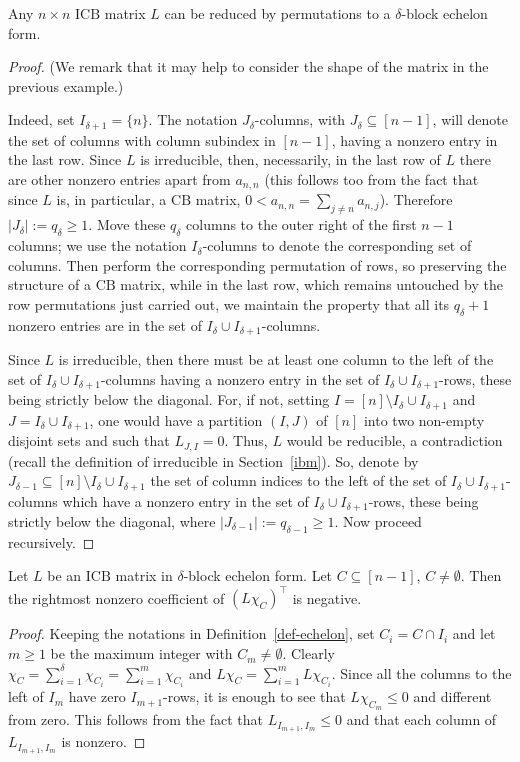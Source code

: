 \documentclass[ALCO]{cedram}
\newcommand{\icb}{\mbox{$\mathrm{ICB}$}}
\newcommand{\cb}{\mbox{$\mathrm{CB}$}}
\begin{document}
\begin{remark}\label{echelon-reduction}
Any $n\times n$ $\icb$ matrix $L$ can be reduced by permutations to a
$\delta$-block echelon form.
\end{remark}
\begin{proof} (We remark that it may help to consider 
the shape of the matrix in the previous example.)

Indeed, set $I_{\delta+1}=\{n\}$. The notation $J_\delta$-columns,
with $J_{\delta}\subseteq [n-1]$, will denote the set of columns with
column subindex in $[n-1]$, having a nonzero entry in the last
row. Since $L$ is irreducible, then, necessarily, in the last row of
$L$ there are other nonzero entries apart from $a_{n,n}$ (this follows
too from the fact that since $L$ is, in particular, a $\cb$ matrix,
$0<a_{n,n}=\sum_{j\neq n}a_{n,j}$). Therefore $\lvert
J_\delta\rvert:=q_\delta\geq 1$. Move these $q_\delta$ columns to the
outer right of the first $n-1$ columns; we use the notation
$I_\delta$-columns to denote the corresponding set of columns. Then
perform the corresponding permutation of rows, so preserving the
structure of a $\cb$ matrix, while in the last row, which remains
untouched by the row permutations just carried out, we maintain the
property that all its $q_\delta+1$ nonzero entries are in the set of
$I_\delta\cup I_{\delta+1}$-columns.

Since $L$ is irreducible, then there must be at least one column to
the left of the set of $I_\delta\cup I_{\delta+1}$-columns having a
nonzero entry in the set of $I_\delta\cup I_{\delta+1}$-rows, these
being strictly below the diagonal. For, if not, setting
$I=[n]\setminus I_\delta\cup I_{\delta+1}$ and $J=I_\delta\cup
I_{\delta+1}$, one would have a partition $(I,J)$ of $[n]$ into two
non-empty disjoint sets and such that $L_{J,I}=0$. Thus, $L$ would be
reducible, a contradiction (recall the definition of irreducible in
Section~\ref{ibm}). So, denote by $J_{\delta-1}\subseteq [n]\setminus
I_{\delta}\cup I_{\delta+1}$ the set of column indices to the left of
the set of $I_\delta\cup I_{\delta+1}$-columns which have a nonzero
entry in the set of $I_\delta\cup I_{\delta+1}$-rows, these being
strictly below the diagonal, where $\lvert
J_{\delta-1}\rvert:=q_{\delta-1}\geq 1$. Now proceed recursively.
\end{proof}

\begin{remark}\label{rightmost}
Let $L$ be an $\icb$ matrix in $\delta$-block echelon form. Let
$C\subseteq [n-1]$, $C\neq \emptyset$. Then the rightmost nonzero
coefficient of $(L\chi_C)^{\top}$ is negative.
\end{remark}
\begin{proof}
Keeping the notations in Definition~\ref{def-echelon}, set $C_i=C\cap
I_i$ and let $m\geq 1$ be the maximum integer with $C_m\neq
\emptyset$. Clearly
$\chi_C=\sum_{i=1}^{\delta}\chi_{C_i}=\sum_{i=1}^m\chi_{C_i}$ and
$L\chi_C=\sum_{i=1}^mL\chi_{C_i}$. Since all the columns to the left
of $I_m$ have zero $I_{m+1}$-rows, it is enough to see that
$L\chi_{C_m}\leq 0$ and different from zero. This follows from the
fact that $L_{I_{m+1},I_m}\leq 0$ and that each column of
$L_{I_{m+1},I_m}$ is nonzero.
\end{proof}
\end{document}

